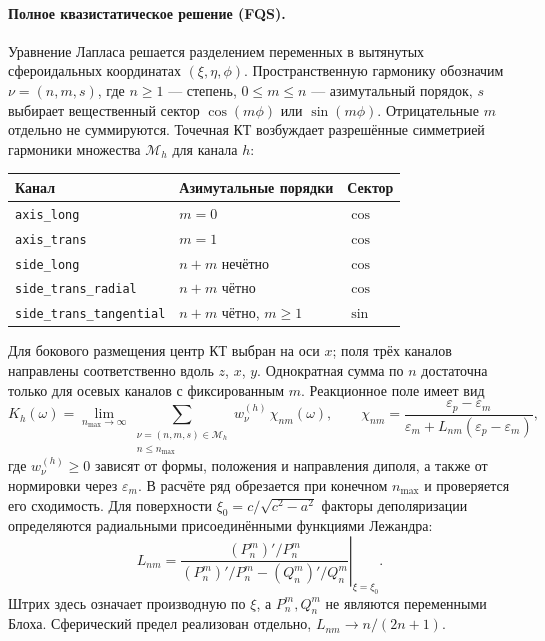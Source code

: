 \paragraph{Полное квазистатическое решение (FQS).} Уравнение Лапласа решается
разделением переменных в вытянутых сфероидальных координатах
$(\xi,\eta,\phi)$. Пространственную гармонику обозначим
$\nu=(n,m,s)$, где $n\ge1$ --- степень, $0\le m\le n$ --- азимутальный
порядок, $s$ выбирает вещественный сектор $\cos(m\phi)$ или $\sin(m\phi)$.
Отрицательные $m$ отдельно не суммируются. Точечная КТ возбуждает
разрешённые симметрией гармоники множества $\mathcal M_h$ для канала $h$:
\begin{center}\small
\begin{tabular}{lll}
  \toprule
  Канал & Азимутальные порядки & Сектор \\
  \midrule
  \texttt{axis\_long} & $m=0$ & $\cos$ \\
  \texttt{axis\_trans} & $m=1$ & $\cos$ \\
  \texttt{side\_long} & $n+m$ нечётно & $\cos$ \\
  \texttt{side\_trans\_radial} & $n+m$ чётно & $\cos$ \\
  \texttt{side\_trans\_tangential} & $n+m$ чётно, $m\ge1$ & $\sin$ \\
  \bottomrule
\end{tabular}
\end{center}
Для бокового размещения центр КТ выбран на оси $x$; поля трёх каналов
направлены соответственно вдоль $z$, $x$, $y$. Однократная сумма по $n$
достаточна только для осевых каналов с фиксированным $m$.
Реакционное поле имеет вид
\begin{equation}
  K_h(\omega)=\lim_{n_{\max}\to\infty}
  \sum_{\substack{\nu=(n,m,s)\in\mathcal M_h\\n\le n_{\max}}}
       w^{(h)}_\nu\,\chi_{nm}(\omega),
  \qquad
  \chi_{nm}=\frac{\varepsilon_p-\varepsilon_m}
  {\varepsilon_m+L_{nm}(\varepsilon_p-\varepsilon_m)},
  \label{eq:K-series}
\end{equation}
где $w^{(h)}_\nu\ge0$ зависят от формы, положения и направления диполя,
а также от нормировки через $\varepsilon_m$. В расчёте ряд обрезается
при конечном $n_{\max}$ и проверяется его сходимость. Для поверхности
$\xi_0=c/\sqrt{c^2-a^2}$ факторы деполяризации определяются радиальными
присоединёнными функциями Лежандра:
\begin{equation}
  L_{nm}=\left.
  \frac{(P_n^m)'/P_n^m}{(P_n^m)'/P_n^m-(Q_n^m)'/Q_n^m}
  \right|_{\xi=\xi_0}.
  \label{eq:modal-L}
\end{equation}
Штрих здесь означает производную по $\xi$, а $P_n^m,Q_n^m$
не являются переменными Блоха. Сферический предел реализован отдельно,
$L_{nm}\to n/(2n+1)$.

